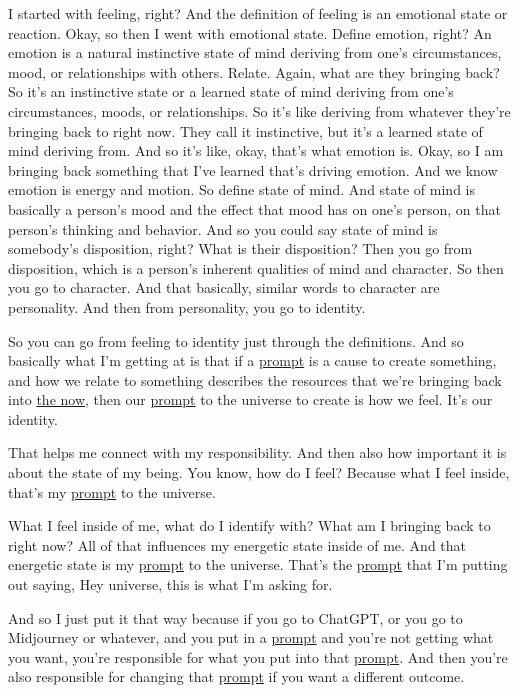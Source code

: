\documentclass{article}
\begin{document}
I started with feeling, right? And the definition of feeling is an emotional state or reaction. Okay, so then I went with emotional state. Define emotion, right? An emotion is a natural instinctive state of mind deriving from one's circumstances, mood, or relationships with others. Relate. Again, what are they bringing back? So it's an instinctive state or a learned state of mind deriving from one's circumstances, moods, or relationships. So it's like deriving from whatever they're bringing back to right now. They call it instinctive, but it's a learned state of mind deriving from. And so it's like, okay, that's what emotion is. Okay, so I am bringing back something that I've learned that's driving emotion. And we know emotion is energy and motion. So define state of mind. And state of mind is basically a person's mood and the effect that mood has on one's person, on that person's thinking and behavior. And so you could say state of mind is somebody's disposition, right? What is their disposition? Then you go from disposition, which is a person's inherent qualities of mind and character. So then you go to character. And that basically, similar words to character are personality. And then from personality, you go to identity.

So you can go from feeling to identity just through the definitions. And so basically what I'm getting at is that if a \hyperlink{gloss:prompt}{prompt} is a cause to create something, and how we relate to something describes the resources that we're bringing back into \hyperlink{gloss:the_now}{the now}, then our \hyperlink{gloss:prompt}{prompt} to the universe to create is how we feel. It's our identity.

That helps me connect with my responsibility. And then also how important it is about the state of my being. You know, how do I feel? Because what I feel inside, that's my \hyperlink{gloss:prompt}{prompt} to the universe.

What I feel inside of me, what do I identify with? What am I bringing back to right now? All of that influences my energetic state inside of me. And that energetic state is my \hyperlink{gloss:prompt}{prompt} to the universe. That's the \hyperlink{gloss:prompt}{prompt} that I'm putting out saying, Hey universe, this is what I'm asking for.

And so I just put it that way because if you go to ChatGPT, or you go to Midjourney or whatever, and you put in a \hyperlink{gloss:prompt}{prompt} and you're not getting what you want, you're responsible for what you put into that \hyperlink{gloss:prompt}{prompt}. And then you're also responsible for changing that \hyperlink{gloss:prompt}{prompt} if you want a different outcome.
\end{document}
